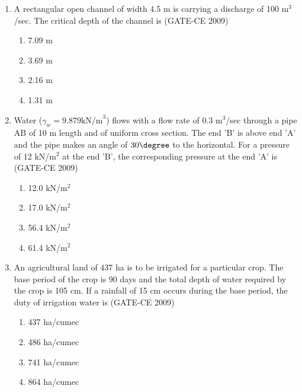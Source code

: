 \documentclass[journal,12pt,onecolumn]{article}
\theoremstyle{remark}
\begin{document}
\begin{enumerate}
    \item A rectangular open channel of width 4.5 m is carrying a discharge of 100 m$^3$/sec. The critical depth of the channel is (GATE-CE 2009)
    \begin{multicols}{2}
    \begin{enumerate}
        \item 7.09 m 
        \item 3.69 m 
        \item 2.16 m 
        \item 1.31 m
    \end{enumerate}
\end{multicols}
    
    \item Water ($\gamma_w = 9.879 \text{kN/m}^3$) flows with a flow rate of 0.3 m$^3$/sec through a pipe AB of 10 m length and of uniform cross section. The end 'B' is above end 'A' and the pipe makes an angle of $30\degree$ to the horizontal. For a pressure of 12 kN/m$^2$ at the end 'B', the corresponding pressure at the end 'A' is (GATE-CE 2009)
   \begin{multicols}{2}
    \begin{enumerate}
        \item 12.0 kN/m$^2$ 
        \item 17.0 kN/m$^2$ 
        \item 56.4 kN/m$^2$ 
        \item 61.4 kN/m$^2$
    \end{enumerate}
\end{multicols}
    
    \item An agricultural land of 437 ha is to be irrigated for a particular crop. The base period of the crop is 90 days and the total depth of water required by the crop is 105 cm. If a rainfall of 15 cm occurs during the base period, the duty of irrigation water is (GATE-CE 2009)
    \begin{multicols}{2}
    \begin{enumerate}
        \item 437 ha/cumec 
        \item 486 ha/cumec 
        \item 741 ha/cumec 
        \item 864 ha/cumec
    \end{enumerate}
\end{multicols}


\end{enumerate}
\end{document}
